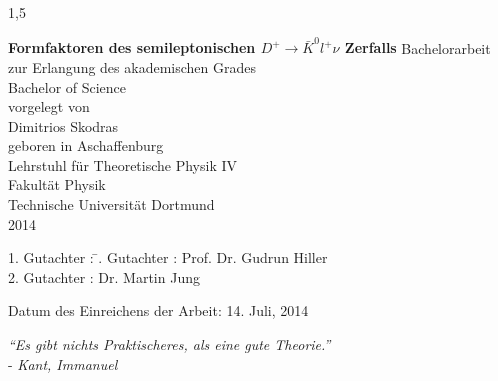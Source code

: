 \documentclass[11pt,a4paper,twoside]{report}
\begin{document}
\begin{spacing}{1,5}

%
%


\newcommand{\thetitle}{Formfaktoren des semileptonischen $D^+ \rightarrow \bar K^0 l^+ \nu$ Zerfalls}

\thispagestyle{empty}
\begin{center}
\Huge\textbf{\thetitle}
\vfill
\vfill
\Large
Bachelorarbeit \\ zur Erlangung des akademischen Grades \\ Bachelor of Science \\
\vspace{20pt}
\normalsize
vorgelegt von \\[5pt]
{\Large Dimitrios Skodras} \\[5pt]
geboren in Aschaffenburg \\
\vspace{20pt}
Lehrstuhl für Theoretische Physik IV \\ Fakultät Physik \\
Technische Universität Dortmund \\ 2014
\end{center}
\newpage


\thispagestyle{empty}
\vspace*{\fill}
\begin{tabbing}
1. Gutachter : \=. Gutachter : \>Prof. Dr. Gudrun Hiller \\[11pt]
2. Gutachter : \>Dr. Martin Jung\\[11pt]
\end{tabbing}
\vspace{11pt}
Datum des Einreichens der Arbeit: 14. Juli, 2014
\newpage
\thispagestyle{empty}
\begin{flushright} 
\textit{``Es gibt nichts Praktischeres, als eine gute Theorie.''}\\
- \textit{Kant, Immanuel}\\
\vspace{2cm}
\end{flushright}


\end{spacing}
\end{document}
